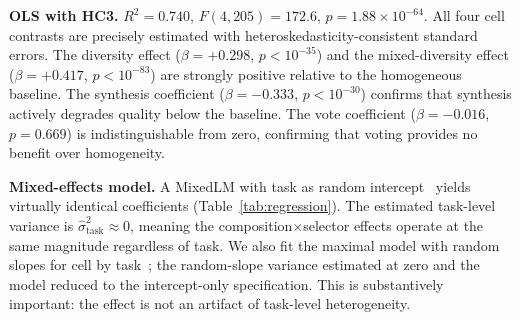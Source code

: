 \documentclass[10pt,twocolumn]{article}
\theoremstyle{remark}
\begin{document}
\begin{table}[t]
  \centering
  \caption{Regression results. Reference category: \texttt{homo\_opus+judge} (intercept). All effects stable across specifications; task variance $\approx 0$. $^{***}p < 0.001$.}
  \label{tab:regression}
\end{table}

\textbf{OLS with HC3.} $R^2 = 0.740$, $F(4, 205) = 172.6$, $p = 1.88 \times 10^{-64}$. All four cell contrasts are precisely estimated with heteroskedasticity-consistent standard errors. The diversity effect ($\beta = +0.298$, $p < 10^{-35}$) and the mixed-diversity effect ($\beta = +0.417$, $p < 10^{-83}$) are strongly positive relative to the homogeneous baseline. The synthesis coefficient ($\beta = -0.333$, $p < 10^{-30}$) confirms that synthesis actively degrades quality below the baseline. The vote coefficient ($\beta = -0.016$, $p = 0.669$) is indistinguishable from zero, confirming that voting provides no benefit over homogeneity.

\textbf{Mixed-effects model.} A MixedLM with task as random intercept~\cite{barr2013random} yields virtually identical coefficients (Table~\ref{tab:regression}). The estimated task-level variance is $\hat{\sigma}^2_\mathrm{task} \approx 0$, meaning the composition$\times$selector effects operate at the same magnitude regardless of task. We also fit the maximal model with random slopes for cell by task~\cite{barr2013random}; the random-slope variance estimated at zero and the model reduced to the intercept-only specification. This is substantively important: the effect is not an artifact of task-level heterogeneity.
\end{document}

